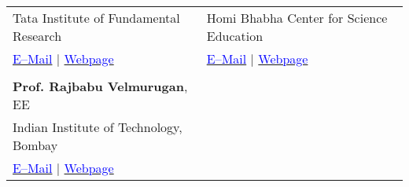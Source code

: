 \documentclass[margin,line]{res}
\begin{document}
\begin{resume}
\begin{tabular}{@{}p{3in}p{3in}}
Tata Institute of Fundamental Research & Homi Bhabha Center for Science Education \\
\href{mailto:vahia@tifr.res.in}{\textcolor{blue}{E--Mail}} $|$ \href{http://www.tifr.res.in/~vahia/}{\textcolor{blue}{Webpage}} & \href{mailto:anikets@hbcse.tifr.res.in}{\textcolor{blue}{E--Mail}} $|$ \href{http://www.hbcse.tifr.res.in/people/academic/aniket-sule}{\textcolor{blue}{Webpage}} \\
\vspace{1pt} & \vspace{1pt} \\
\textbf{Prof. Rajbabu Velmurugan}, EE & \\ %
Indian Institute of Technology, Bombay & \\ %
\href{mailto:rajbabu@ee.iitb.ac.in}{\textcolor{blue}{E--Mail}} $|$ \href{https://www.ee.iitb.ac.in/web/faculty/homepage/rajbabu}{\textcolor{blue}{Webpage}} & \\ %
\end{tabular}
\end{resume}
\end{document}
